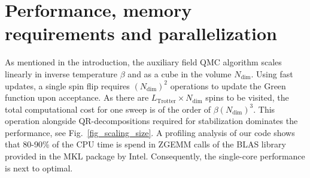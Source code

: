 \section{Performance, memory requirements and parallelization} \label{sec:performance}
%

As mentioned in the  introduction, the auxiliary field QMC algorithm scales linearly in inverse temperature $\beta$ and as a cube in the volume $N_{\text{dim}}$. Using fast updates,  a single spin flip  requires $(N_{\text{dim}})^2$ operations to update the Green function upon acceptance.  As there are $L_{\text{Trotter}}\times N_{\text{dim}}$ spins to be visited, the total computational cost for one sweep is of the order of $\beta (N_{\text{dim}})^3$. This operation  alongside QR-decompositions required for stabilization  dominates the performance,  see Fig.~\ref{fig_scaling_size}. A profiling analysis of our code shows that 80-90\% of the CPU time is spend in ZGEMM calls of the BLAS library provided in the MKL package by Intel. Consequently, the single-core performance is next to optimal.

